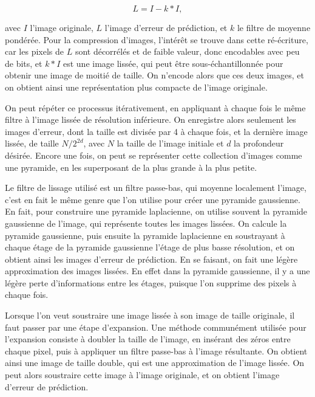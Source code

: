 \begin{equation}
    L = I - k * I,
\end{equation}

avec $I$ l'image originale, $L$ l'image d'erreur de prédiction, et $k$ le filtre de moyenne pondérée. Pour la compression d'images, l'intérêt se trouve dans cette ré-écriture, car les pixels de $L$ sont décorrélés et de faible valeur, donc encodables avec peu de bits, et $k*I$ est une image lissée, qui peut être sous-échantillonnée pour obtenir une image de moitié de taille. On n'encode alors que ces deux images, et on obtient ainsi une représentation plus compacte de l'image originale.

\bigskip

On peut répéter ce processus itérativement, en appliquant à chaque fois le même filtre à l'image lissée de résolution inférieure. On enregistre alors seulement les images d'erreur, dont la taille est divisée par 4 à chaque fois, et la dernière image lissée, de taille $N/2^{2d}$, avec $N$ la taille de l'image initiale et $d$ la profondeur désirée. Encore une fois, on peut se représenter cette collection d'images comme une pyramide, en les superposant de la plus grande à la plus petite.

\bigskip

Le filtre de lissage utilisé est un filtre passe-bas, qui moyenne localement l'image, c'est en fait le même genre que l'on utilise pour créer une pyramide gaussienne. En fait, pour construire une pyramide laplacienne, on utilise souvent la pyramide gaussienne de l'image, qui représente toutes les images lissées. On calcule la pyramide gaussienne, puis ensuite la pyramide laplacienne en soustrayant à chaque étage de la pyramide gaussienne l'étage de plus basse résolution, et on obtient ainsi les images d'erreur de prédiction. En se faisant, on fait une légère approximation des images lissées. En effet dans la pyramide gaussienne, il y a une légère perte d'informations entre les étages, puisque l'on supprime des pixels à chaque fois.

\bigskip

Lorsque l'on veut soustraire une image lissée à son image de taille originale, il faut passer par une étape d'expansion. Une méthode communément utilisée pour l'expansion consiste à doubler la taille de l'image, en insérant des zéros entre chaque pixel, puis à appliquer un filtre passe-bas à l'image résultante. On obtient ainsi une image de taille double, qui est une approximation de l'image lissée. On peut alors soustraire cette image à l'image originale, et on obtient l'image d'erreur de prédiction.

